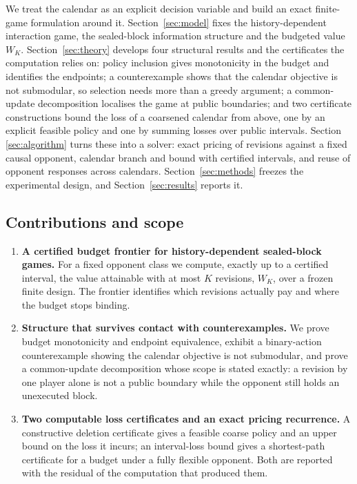 We treat the calendar as an explicit decision variable and build an exact
finite-game formulation around it. Section~\ref{sec:model} fixes the
history-dependent interaction game, the sealed-block information structure and
the budgeted value $W_K$. Section~\ref{sec:theory} develops four structural
results and the certificates the computation relies on:
policy inclusion gives monotonicity in the budget and identifies the endpoints;
a counterexample shows that the calendar objective is not submodular, so
selection needs more than a greedy argument; a common-update decomposition
localises the game at public boundaries; and two certificate constructions
bound the loss of a coarsened calendar from above, one by an explicit feasible
policy and one by summing losses over public intervals. Section
\ref{sec:algorithm} turns these into a solver: exact pricing of revisions
against a fixed causal opponent, calendar branch and bound with certified
intervals, and reuse of opponent responses across calendars.
Section~\ref{sec:methods} freezes the experimental design, and
Section~\ref{sec:results} reports it.

\subsection{Contributions and scope}

\begin{enumerate}
\item \textbf{A certified budget frontier for history-dependent sealed-block
games.} For a fixed opponent class we compute, exactly up to a certified
interval, the value attainable with at most $K$ revisions, $W_K$, over a
frozen finite design. The frontier identifies which revisions actually pay and
where the budget stops binding.
\item \textbf{Structure that survives contact with counterexamples.} We prove
budget monotonicity and endpoint equivalence, exhibit a binary-action
counterexample showing the calendar objective is not submodular, and prove a
common-update decomposition whose scope is stated exactly: a revision by one
player alone is not a public boundary while the opponent still holds an
unexecuted block.
\item \textbf{Two computable loss certificates and an exact pricing
recurrence.} A constructive deletion certificate gives a feasible coarse
policy and an upper bound on the loss it incurs; an interval-loss bound gives
a shortest-path certificate for a budget under a fully flexible opponent. Both
are reported with the residual of the computation that produced them.
\end{enumerate}

